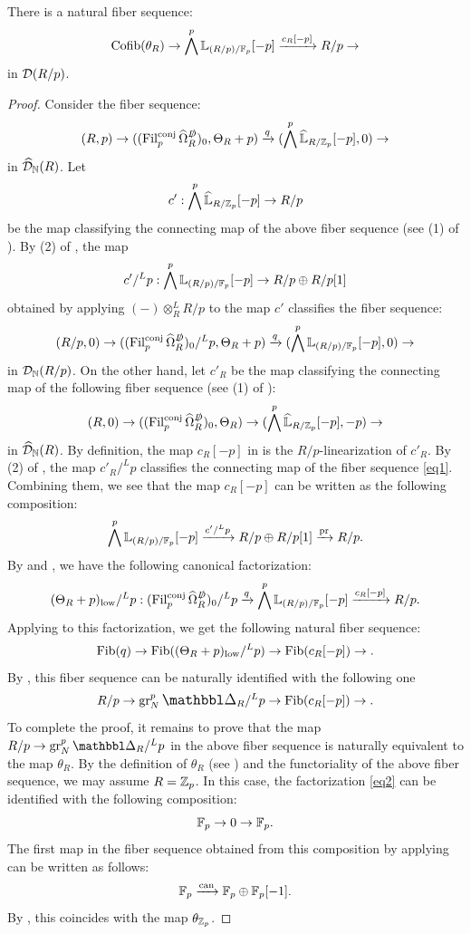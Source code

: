 \documentclass[11pt,a4paper]{amsart}
\begin{document}
\begin{theorem}\label{proposition2.6}
    There is a natural fiber sequence:
    \[\operatorname{Cofib}(\theta_R)\to \bigwedge^p\mathbb{L}_{(R/p)/\mathbb{F}_p}[-p]\xrightarrow[]{c_R[-p]}R/p\to \] in $\mathcal{D}(R/p)$.
\end{theorem}
\begin{proof}
    Consider the fiber sequence:
    \[(R,p)\to ((\operatorname{Fil}_p^{\operatorname{conj}}\widehat\Omega_R^{\slashed D})_0,\Theta_R+p)\xrightarrow[]{q} (\bigwedge ^p\widehat{\mathbb{L}}_{R/\mathbb{Z}_p}[-p],0)\to \] in $\widehat{\mathcal{D}}_{\mathbb{N}}(R)$. Let
    \[c':\bigwedge ^p\widehat{\mathbb{L}}_{R/\mathbb{Z}_p}[-p]\to R/p\] be the map classifying the connecting map of the above fiber sequence (see (1) of ). By (2) of , the map
    \[c'/^Lp:\bigwedge ^p\mathbb{L}_{(R/p)/\mathbb{F}_p}[-p]\to R/p\oplus R/p[1]\] obtained by applying $(-)\otimes_R^LR/p$ to the map $c'$ classifies the fiber sequence:
    \begin{equation} \label{eq1}
        (R/p,0)\to ((\operatorname{Fil}_p^{\operatorname{conj}}\widehat\Omega_R^{\slashed D})_0/^Lp,\Theta_R+p)\xrightarrow[]{q} (\bigwedge ^p\mathbb{L}_{(R/p)/\mathbb{F}_p}[-p],0)\to
    \end{equation}
    in $\mathcal{D}_{\mathbb{N}}(R/p)$.
    On the other hand, let $c'_R$ be the map classifying the connecting map of the following fiber sequence (see (1) of ):
    \[(R,0)\to ((\operatorname{Fil}_p^{\operatorname{conj}}\widehat\Omega_R^{\slashed D})_0,\Theta_R)\to (\bigwedge ^p\widehat{\mathbb{L}}_{R/\mathbb{Z}_p}[-p],-p)\to \] in $\widehat{\mathcal{D}}_{\mathbb{N}}(R)$. By definition, the map $c_R[-p]$ in  is the $R/p$-linearization of $c'_R$. By (2) of , the map $c'_R/^Lp$ classifies the connecting map of the fiber sequence \eqref{eq1}. Combining them, we see that the map $c_R[-p]$ can be written as the following composition:
    \[\bigwedge ^p\mathbb{L}_{(R/p)/\mathbb{F}_p}[-p]\xrightarrow[]{c'/^Lp}R/p\oplus R/p[1]\xrightarrow[]{\operatorname{pr}}R/p.\] By  and , we have the following canonical factorization:
    \begin{equation} \label{eq2}
        (\Theta_R+p)_{\mathrm{low}}/^Lp:(\operatorname{Fil}_p^{\operatorname{conj}}\widehat\Omega_R^{\slashed D})_0/^Lp\xrightarrow[]{q}\bigwedge ^p{\mathbb{L}}_{(R/p)/\mathbb{F}_p}[-p]\xrightarrow[]{c_R[-p]}R/p.
    \end{equation}
    Applying  to this factorization, we get the following natural fiber sequence:
    \[\operatorname{Fib}(q)\to \operatorname{Fib}((\Theta_R+p)_{\mathrm{low}}/^Lp)\to \operatorname{Fib}(c_R[-p])\to. \] By , this fiber sequence can be naturally identified with the following one \[R/p\to \gr_N^p\prism_R/^Lp\to \Fib(c_R[-p])\to .\]
    To complete the proof, it remains to prove that the map $R/p\to \gr_N^p\prism_R/^Lp$ in the above fiber sequence is naturally equivalent to the map $\theta_R$. By the definition of $\theta_R$ (see ) and the functoriality of the above fiber sequence, we may assume $R=\mathbb{Z}_p$. In this case, the factorization \eqref{eq2} can be identified with the following composition:
    \[\mathbb{F}_p\to 0\to \mathbb{F}_p.\] The first map in the fiber sequence obtained from this composition by applying  can be written as follows:
    \[\mathbb{F}_p\xrightarrow[]{\operatorname{can}}\mathbb{F}_p\oplus\mathbb{F}_p[-1].\] By , this coincides with the map $\theta_{\mathbb{Z}_p}$.
\end{proof}
\end{document}
